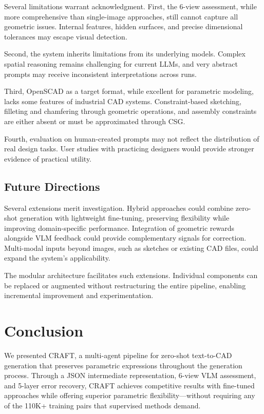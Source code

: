 \documentclass[5p,twocolumn,10pt,times]{elsarticle}
\begin{document}
Several limitations warrant acknowledgment. First, the 6-view assessment, while more comprehensive than single-image approaches, still cannot capture all geometric issues. Internal features, hidden surfaces, and precise dimensional tolerances may escape visual detection.

Second, the system inherits limitations from its underlying models. Complex spatial reasoning remains challenging for current LLMs, and very abstract prompts may receive inconsistent interpretations across runs.

Third, OpenSCAD as a target format, while excellent for parametric modeling, lacks some features of industrial CAD systems. Constraint-based sketching, filleting and chamfering through geometric operations, and assembly constraints are either absent or must be approximated through CSG.

Fourth, evaluation on human-created prompts may not reflect the distribution of real design tasks. User studies with practicing designers would provide stronger evidence of practical utility.

\subsection{Future Directions}

Several extensions merit investigation. Hybrid approaches could combine zero-shot generation with lightweight fine-tuning, preserving flexibility while improving domain-specific performance. Integration of geometric rewards alongside VLM feedback could provide complementary signals for correction. Multi-modal inputs beyond images, such as sketches or existing CAD files, could expand the system's applicability.

The modular architecture facilitates such extensions. Individual components can be replaced or augmented without restructuring the entire pipeline, enabling incremental improvement and experimentation.



\section{Conclusion}
\label{sec:conclusion}

We presented CRAFT, a multi-agent pipeline for zero-shot text-to-CAD generation that preserves parametric expressions throughout the generation process. Through a JSON intermediate representation, 6-view VLM assessment, and 5-layer error recovery, CRAFT achieves competitive results with fine-tuned approaches while offering superior parametric flexibility---without requiring any of the 110K+ training pairs that supervised methods demand.
\end{document}
